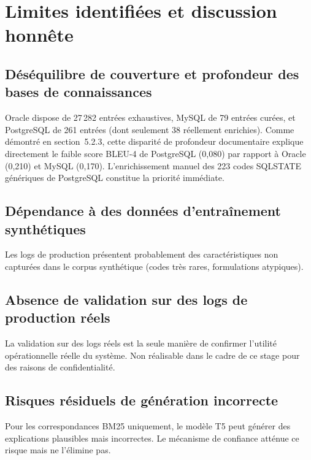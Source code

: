 \documentclass[12pt,a4paper]{report}
\begin{document}
\section{Limites identifi\'ees et discussion honn\^ete}
\label{sec:limites}

\subsection{D\'es\'equilibre de couverture et profondeur des bases de connaissances}

Oracle dispose de 27\,282 entr\'ees exhaustives, MySQL de 79 entr\'ees cur\'ees, et
PostgreSQL de 261 entr\'ees (dont seulement 38 r\'eellement enrichies). Comme
d\'emontr\'e en section~5.2.3, cette disparit\'e de profondeur documentaire explique
directement le faible score BLEU-4 de PostgreSQL (0,080) par rapport \`a Oracle (0,210)
et MySQL (0,170). L'enrichissement manuel des 223 codes SQLSTATE g\'en\'eriques de
PostgreSQL constitue la priorit\'e imm\'ediate.

\subsection{D\'ependance \`a des donn\'ees d'entra\^inement synth\'etiques}

Les logs de production pr\'esentent probablement des caract\'eristiques non captur\'ees
dans le corpus synth\'etique (codes tr\`es rares, formulations atypiques).

\subsection{Absence de validation sur des logs de production r\'eels}

La validation sur des logs r\'eels est la seule mani\`ere de confirmer l'utilit\'e
op\'erationnelle r\'eelle du syst\`eme. Non r\'ealisable dans le cadre de ce stage
pour des raisons de confidentialit\'e.

\subsection{Risques r\'esiduels de g\'en\'eration incorrecte}

Pour les correspondances BM25 uniquement, le mod\`ele T5 peut g\'en\'erer des
explications plausibles mais incorrectes. Le m\'ecanisme de confiance att\'enue ce
risque mais ne l'\'elimine pas.

\end{document}
